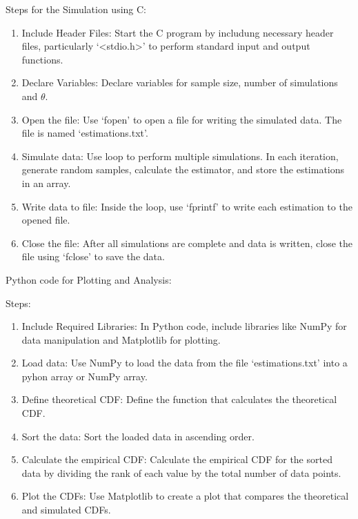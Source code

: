 \documentclass{article}[]
\begin{document}
Steps for the Simulation using C: 
\begin{enumerate}
\item Include Header Files: Start the C program by includung necessary header files, particularly `\textless stdio.h\textgreater' to perform standard input and output functions.
\item Declare Variables: Declare variables for sample size, number of simulations and $\theta$.
\item Open the file: Use `fopen' to open a file for writing the simulated data. The file is named `estimations.txt'.
\item Simulate data: Use loop to perform multiple simulations. In each iteration, generate random samples, calculate the estimator, and store the estimations in an array.
\item Write data to file: Inside the loop, use `fprintf' to write each estimation to the opened file.
\item Close the file: After all simulations are complete and data is written, close the file using `fclose' to save the data.
\end{enumerate}

Python code for Plotting and Analysis:

Steps: 
\begin{enumerate}
\item Include Required Libraries: In Python code, include libraries like NumPy for data manipulation and Matplotlib for plotting.
\item Load data: Use NumPy to load the data from the file `estimations.txt' into a pyhon array or NumPy array.
\item Define theoretical CDF: Define the function that calculates the theoretical CDF.
\item Sort the data: Sort the loaded data in ascending order.
\item Calculate the empirical CDF: Calculate the empirical CDF for the sorted data by dividing the rank of each value by the total number of data points.
\item Plot the CDFs: Use Matplotlib to create a plot that compares the theoretical and simulated CDFs.
\end{enumerate}
\end{document}
